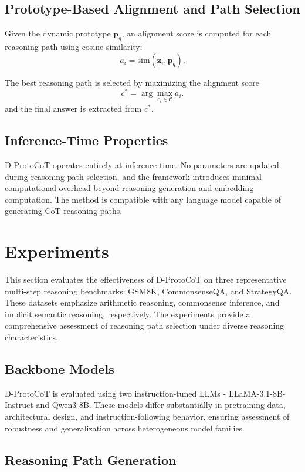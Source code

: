 \documentclass[a4paper,fleqn]{cas-dc}
\begin{document}
\subsection{Prototype-Based Alignment and Path Selection}

Given the dynamic prototype $\mathbf{p}_q$, an alignment score is computed for each reasoning path using cosine similarity:
\[
a_i = \text{sim}(\mathbf{z}_i, \mathbf{p}_q).
\]

The best reasoning path is selected by maximizing the alignment score
\[
c^{*} = \arg\max_{c_i \in \mathcal{C}} a_i.
\]
and the final answer is extracted from $c^{*}$.

\subsection{Inference-Time Properties}

D-ProtoCoT operates entirely at inference time.
No parameters are updated during reasoning path selection, and the framework introduces minimal computational overhead beyond reasoning generation and embedding computation.
The method is compatible with any language model capable of generating CoT reasoning paths.

\section{Experiments}

This section evaluates the effectiveness of D-ProtoCoT on three representative multi-step reasoning benchmarks: GSM8K, CommonsenseQA, and StrategyQA. These datasets emphasize arithmetic reasoning, commonsense inference, and implicit semantic reasoning, respectively. The experiments provide a comprehensive assessment of reasoning path selection under diverse reasoning characteristics.

\subsection{Backbone Models}

D-ProtoCoT is evaluated using two instruction-tuned LLMs - LLaMA-3.1-8B-Instruct and Qwen3-8B. These models differ substantially in pretraining data, architectural design, and instruction-following behavior, ensuring assessment of robustness and generalization across heterogeneous model families.

\subsection{Reasoning Path Generation}
\end{document}
